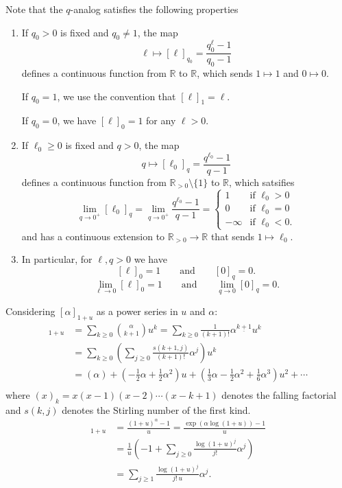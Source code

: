 \documentclass{amsart}
\theoremstyle{definition}
\newcommand{\RR}{\mathbb{R}}
\begin{document}
Note that the $q$-analog satisfies the following properties
\begin{enumerate}
\item If $q_0>0$ is fixed and $q_0 \neq 1$, the map 
$$\ell \mapsto [\ell]_{q_0} = \frac{q_0^\ell - 1}{q_0 - 1}$$
defines a continuous function from $\RR$ to $\RR$,
which sends $1 \mapsto 1$ and $0 \mapsto 0$.

If $q_0 = 1$,
we use the convention that $[\ell]_1 = \ell$.

If $q_0 = 0$,
we have $[\ell]_0 = 1$ for any $\ell > 0$.

\item If $\ell_0\geq 0$ is fixed and $q > 0$,
the map 
$$q \mapsto [\ell_0]_q = \frac{q^{\ell_0} - 1}{q - 1}$$
defines a continuous function from $\RR_{>0} \setminus\{1\}$ to $\RR$,
which satsifies
$$ \lim_{q \to 0^+} [\ell_0]_q  = 
\lim_{q \to 0^+} \frac{q^{\ell_0} - 1}{q - 1} =
\begin{cases}
 1 &\text{if } \ell_0 > 0 \\
 0 &\text{if } \ell_0 = 0 \\
 -\infty &\text{if } \ell_0 <0.
\end{cases}$$
and has a continuous extension to $\RR_{>0} \to \RR$ that sends $1 \mapsto \ell_0$.

\item 
In particular, for $\ell, q > 0$ we have
$$
[\ell]_0 = 1 
\qquad\text{and}\qquad
[0]_q = 0.
$$
$$
\lim_{\ell \to 0} [\ell]_0 = 1 
\qquad\text{and}\qquad
\lim_{q \to 0} [0]_q = 0.
$$
\end{enumerate}

Considering $[\alpha]_{1+u}$ as a power series in $u$ and $\alpha$:
\begin{align*}
[\alpha]_{1+u} &= \sum_{k\geq 0} \binom{\alpha}{k+1}u^k  
= \sum_{k\geq 0} \frac1{(k+1)!} \alpha^{\underline{k+1}} u^k \\
&= \sum_{k\geq 0} \left( \sum_{j \geq 0} \frac{s(k+1,j)}{(k+1)!} \alpha^j \right) u^k \\
&= (\alpha) + (-\frac12\alpha + \frac12 \alpha^2)u + (\frac13\alpha - \frac12 \alpha^2 + \frac16 \alpha^3)u^2 + \cdots \\
\end{align*}
where $(x)_k = x(x-1)(x-2)\cdots(x-k+1)$ denotes the falling factorial and $s(k,j)$ denotes the Stirling number of the first kind.
\begin{align*}
[\alpha]_{1+u} &= \frac{(1+u)^\alpha - 1}{u}
= \frac{\exp(\alpha \log(1+u)) - 1}{u} \\
&= \frac1{u} \left( -1 + \sum_{j\geq 0} \frac{\log(1+u)^j}{j!} \alpha^j\right) \\
&= \sum_{j\geq 1} \frac{\log(1+u)^j}{j! \, u} \alpha^j .
\end{align*}
\end{document}

